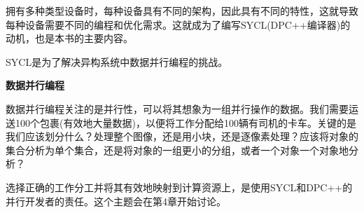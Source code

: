 拥有多种类型设备时，每种设备具有不同的架构，因此具有不同的特性，这就导致每种设备需要不同的编程和优化需求。这就成为了编写SYCL(DPC++编译器)的动机，也是本书的主要内容。\par

\begin{tcolorbox}[colback=red!5!white,colframe=red!75!black]
SYCL是为了解决异构系统中数据并行编程的挑战。
\end{tcolorbox}

\hspace*{\fill} \par %
\textbf{数据并行编程}

数据并行编程关注的是并行性，可以将其想象为一组并行操作的数据。我们需要运送100个包裹(有效地大量数据)，以便将工作分配给100辆有司机的卡车。关键的是我们应该划分什么？处理整个图像，还是用小块，还是逐像素处理？应该将对象的集合分析为单个集合，还是将对象的一组更小的分组，或者一个对象一个对象地分析？\par

选择正确的工作分工并将其有效地映射到计算资源上，是使用SYCL和DPC++的并行开发者的责任。这个主题会在第4章开始讨论。\par












